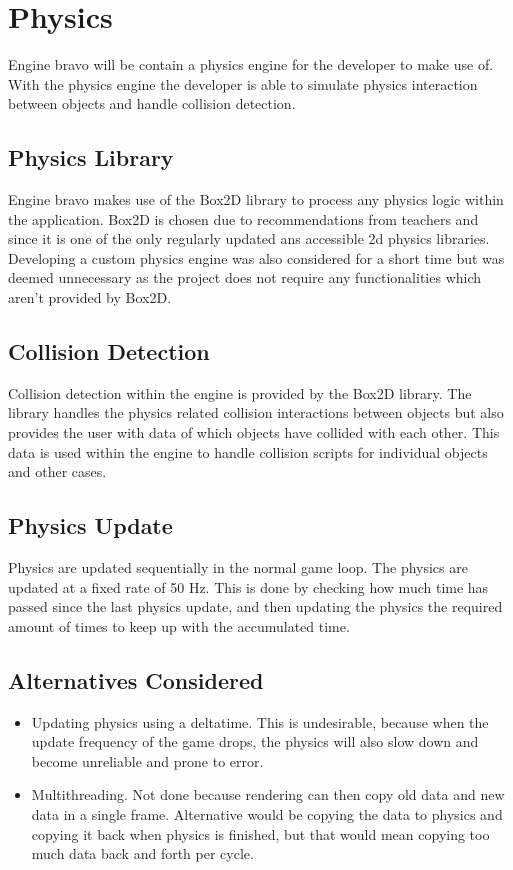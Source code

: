 \section{Physics}
\label{sec:physics}
Engine bravo will be contain a physics engine for the developer to make use of.
With the physics engine the developer is able to simulate physics interaction between objects and handle collision detection.

\subsection{Physics Library}
Engine bravo makes use of the Box2D library to process any physics logic within the application. 
Box2D is chosen due to recommendations from teachers and since it is one of the only regularly updated ans accessible 2d physics libraries.
Developing a custom physics engine was also considered for a short time but was deemed unnecessary as the project does not require any functionalities which aren't provided by Box2D.

\subsection{Collision Detection}
Collision detection within the engine is provided by the Box2D library. The library handles the physics related collision interactions between objects but also provides the user with data of which objects have collided with each other. This data is used within the engine to handle collision scripts for individual objects and other cases.

\subsection{Physics Update}
Physics are updated sequentially in the normal game loop.
The physics are updated at a fixed rate of 50 Hz. This is done by checking how much time has passed since the last physics update, and then updating the physics the required amount of times to keep up with the accumulated time.

\subsection{Alternatives Considered}
\begin{itemize}
    \item Updating physics using a deltatime. This is undesirable, because when the update frequency of the game drops, the physics will also slow down and become unreliable and prone to error.
    \item Multithreading. Not done because rendering can then copy old data and new data in a single frame. Alternative would be copying the data to physics and copying it back when physics is finished, but that would mean copying too much data back and forth per cycle.
\end{itemize}

